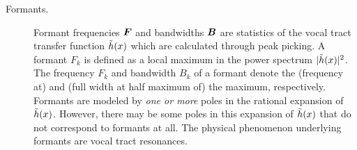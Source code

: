 \begin{description}
\item[Formants.]
Formant frequencies ${\bm F}$ and bandwidths ${\bm B}$ are statistics of the vocal tract transfer function $\tilde{h}(x)$ which are calculated through peak picking.
A formant $F_k$ is defined as a local maximum in the power spectrum $|\tilde{h}(x)|^2$.
The frequency $F_k$ and bandwidth $B_k$ of a formant denote the (frequency at) and (full width at half maximum of) the maximum, respectively.
Formants are modeled by \emph{one or more} poles in the rational expansion of $\tilde{h}(x)$.
However, there may be some poles in this expansion of $\tilde{h}(x)$ that do not correspond to formants at all.
The physical phenomenon underlying formants are vocal tract resonances.
\end{description}
